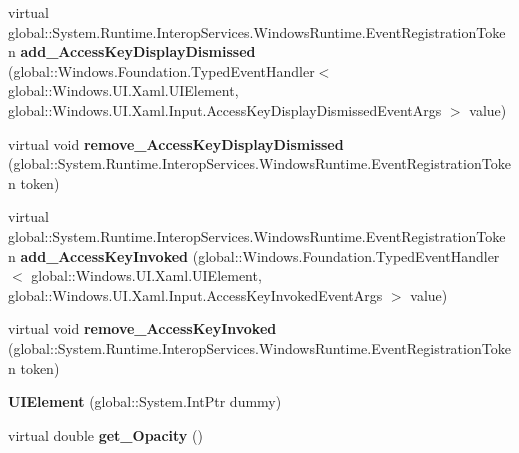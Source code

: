 \begin{DoxyCompactItemize}
\item 
\mbox{\label{class_windows_1_1_u_i_1_1_xaml_1_1_u_i_element_a15fc48463bdeec03ee1aee7533f254f0}} 
virtual global\+::\+System.\+Runtime.\+Interop\+Services.\+Windows\+Runtime.\+Event\+Registration\+Token {\bfseries add\+\_\+\+Access\+Key\+Display\+Dismissed} (global\+::\+Windows.\+Foundation.\+Typed\+Event\+Handler$<$ global\+::\+Windows.\+U\+I.\+Xaml.\+U\+I\+Element, global\+::\+Windows.\+U\+I.\+Xaml.\+Input.\+Access\+Key\+Display\+Dismissed\+Event\+Args $>$ value)
\item 
\mbox{\label{class_windows_1_1_u_i_1_1_xaml_1_1_u_i_element_a7a81e564e7ffcf9a6e1afd9c0e1dacc7}} 
virtual void {\bfseries remove\+\_\+\+Access\+Key\+Display\+Dismissed} (global\+::\+System.\+Runtime.\+Interop\+Services.\+Windows\+Runtime.\+Event\+Registration\+Token token)
\item 
\mbox{\label{class_windows_1_1_u_i_1_1_xaml_1_1_u_i_element_a15ef4390a0a3d7f9f3319b6729fd010b}} 
virtual global\+::\+System.\+Runtime.\+Interop\+Services.\+Windows\+Runtime.\+Event\+Registration\+Token {\bfseries add\+\_\+\+Access\+Key\+Invoked} (global\+::\+Windows.\+Foundation.\+Typed\+Event\+Handler$<$ global\+::\+Windows.\+U\+I.\+Xaml.\+U\+I\+Element, global\+::\+Windows.\+U\+I.\+Xaml.\+Input.\+Access\+Key\+Invoked\+Event\+Args $>$ value)
\item 
\mbox{\label{class_windows_1_1_u_i_1_1_xaml_1_1_u_i_element_a5aad5be80c6fdb9b329d9bc29673cd07}} 
virtual void {\bfseries remove\+\_\+\+Access\+Key\+Invoked} (global\+::\+System.\+Runtime.\+Interop\+Services.\+Windows\+Runtime.\+Event\+Registration\+Token token)
\item 
\mbox{\label{class_windows_1_1_u_i_1_1_xaml_1_1_u_i_element_a27bd7accff1583615f084e98079b911a}} 
{\bfseries U\+I\+Element} (global\+::\+System.\+Int\+Ptr dummy)
\item 
\mbox{\label{class_windows_1_1_u_i_1_1_xaml_1_1_u_i_element_a0653356423d6b2e82584608c68968d68}} 
virtual double {\bfseries get\+\_\+\+Opacity} ()

\end{DoxyCompactItemize}

